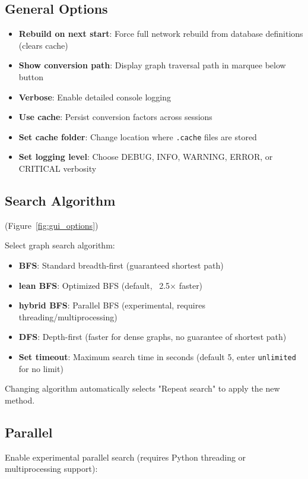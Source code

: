 \documentclass[11pt,a4paper]{report}
\begin{document}
\subsection{General Options}

\begin{itemize}
\item \textbf{Rebuild on next start}: Force full network rebuild from database definitions (clears cache)
\item \textbf{Show conversion path}: Display graph traversal path in marquee below button
\item \textbf{Verbose}: Enable detailed console logging
\item \textbf{Use cache}: Persist conversion factors across sessions
\item \textbf{Set cache folder}: Change location where \texttt{.cache} files are stored
\item \textbf{Set logging level}: Choose DEBUG, INFO, WARNING, ERROR, or CRITICAL verbosity
\end{itemize}

\subsection{Search Algorithm} (Figure~\ref{fig:gui_options})

Select graph search algorithm:

\begin{itemize}
\item \textbf{BFS}: Standard breadth-first (guaranteed shortest path)
\item \textbf{lean BFS}: Optimized BFS (default, ~2.5× faster)
\item \textbf{hybrid BFS}: Parallel BFS (experimental, requires threading/multiprocessing)
\item \textbf{DFS}: Depth-first (faster for dense graphs, no guarantee of shortest path)
\item \textbf{Set timeout}: Maximum search time in seconds (default 5, enter \texttt{unlimited} for no limit)
\end{itemize}

Changing algorithm automatically selects "Repeat search" to apply the new method.

\subsection{Parallel}

Enable experimental parallel search (requires Python threading or multiprocessing support):
\end{document}
